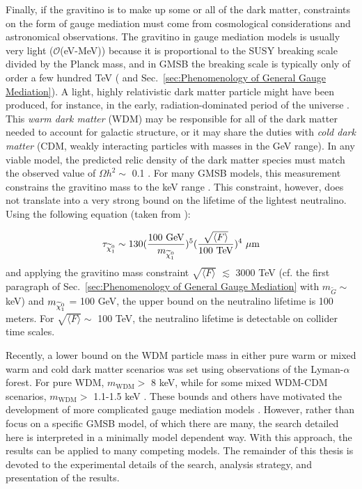 \documentclass[dissertation.tex]{subfiles}
\begin{document}
Finally, if the gravitino is to make up some or all of the dark matter, constraints on the form of gauge mediation must come from cosmological considerations and astronomical observations.  The gravitino in gauge mediation models is usually very light ($\mathcal{O}$(eV-MeV)) because it is proportional to the SUSY breaking scale divided by the Planck mass, and in GMSB the breaking scale is typically only of order a few hundred TeV (\cite{SUSY_primer} and Sec.~\ref{sec:Phenomenology of General Gauge Mediation}).  A light, highly relativistic dark matter particle might have been produced, for instance, in the early, radiation-dominated period of the universe \cite{Lyman_alpha_DM_limits}.  This \textit{warm dark matter} (WDM) may be responsible for all of the dark matter needed to account for galactic structure, or it may share the duties with \textit{cold dark matter} (CDM, weakly interacting particles with masses in the GeV range).  In any viable model, the predicted relic density of the dark matter species must match the observed value of $\Omega h^{2} \sim$ 0.1 \cite{WMAP}.  For many GMSB models, this measurement constrains the gravitino mass to the keV range \cite{long_lived_neutralinos_at_the_Tevatron}.  This constraint, however, does not translate into a very strong bound on the lifetime of the lightest neutralino.  Using the following equation (taken from \cite{long_lived_neutralinos_at_the_Tevatron}):

\begin{equation}
\tau_{\widetilde{\chi}_{1}^{0}} \sim 130(\frac{100\mbox{ GeV}}{m_{\widetilde{\chi}_{1}^{0}}})^{5}(\frac{\sqrt{\langle F\rangle}}{100\mbox{ TeV}})^{4}\mbox{ }\mu\mbox{m}
\end{equation}
%
and applying the gravitino mass constraint $\sqrt{\langle F\rangle}$ $\lesssim$ 3000 TeV (cf. the first paragraph of Sec.~\ref{sec:Phenomenology of General Gauge Mediation} with $m_{\widetilde{G}} \sim$ keV) and $m_{\widetilde{\chi}_{1}^{0}}$ = 100 GeV, the upper bound on the neutralino lifetime is 100 meters.  For $\sqrt{\langle F\rangle} \sim$ 100 TeV, the neutralino lifetime is detectable on collider time scales.

Recently, a lower bound on the WDM particle mass in either pure warm or mixed warm and cold dark matter scenarios was set using observations of the Lyman-$\alpha$ forest.  For pure WDM, $m_{\mathrm{WDM}} >$ 8 keV, while for some mixed WDM-CDM scenarios, $m_{\mathrm{WDM}} >$ 1.1-1.5 keV \cite{Lyman_alpha_DM_limits, cosmo_constraints_on_GMSB}.  These bounds and others have motivated the development of more complicated gauge mediation models \cite{cosmo_constraints_on_GMSB}.  However, rather than focus on a specific GMSB model, of which there are many, the search detailed here is interpreted in a minimally model dependent way.  With this approach, the results can be applied to many competing models.  The remainder of this thesis is devoted to the experimental details of the search, analysis strategy, and presentation of the results.
\end{document}
